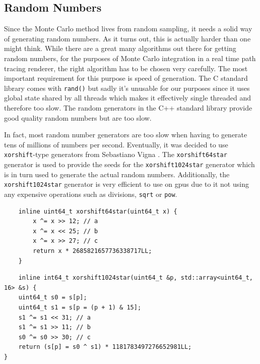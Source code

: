 \documentclass[
  twoside,
  11pt, a4paper,
  footinclude=true,
  headinclude=true,
  cleardoublepage=empty
]{scrreprt}
\begin{document}
\subsection{Random Numbers}
Since the Monte Carlo method lives from random sampling, it needs a solid way of generating random
numbers. As it turns out, this is actually harder than one might think. While there are a great
many algorithms out there for getting random numbers, for the purposes of Monte Carlo integration
in a real time path tracing renderer, the right algorithm has to be chosen very carefully. The most
important requirement for this purpose is speed of generation. The C standard library comes with
\texttt{rand()} but sadly it's unusable for our purposes since it uses global state
shared by all threads which makes it effectively single threaded and therefore too slow.
The random generators in the C++ standard library provide good quality random numbers but are too
slow.

In fact, most random number generators are too slow when having to generate tens of millions of numbers per
second. Eventually, it was decided to use \texttt{xorshift}-type generators from Sebastiano Vigna
\cite{site:xorshift}. The \texttt{xorshift64star} generator is used to provide the seeds for the
\texttt{xorshift1024star} generator which is in turn used to generate the actual random numbers.
Additionally, the \texttt{xorshift1024star} generator is very efficient to use on \acp{gpu} due to
it not using any expensive operations such as divisions, \texttt{sqrt} or \texttt{pow}.

\begin{verbatim}
    inline uint64_t xorshift64star(uint64_t x) {
        x ^= x >> 12; // a
        x ^= x << 25; // b
        x ^= x >> 27; // c
        return x * 2685821657736338717LL;
    }
\end{verbatim}

\begin{verbatim}
    inline int64_t xorshift1024star(uint64_t &p, std::array<uint64_t, 16> &s) {
    uint64_t s0 = s[p];
    uint64_t s1 = s[p = (p + 1) & 15];
    s1 ^= s1 << 31; // a
    s1 ^= s1 >> 11; // b
    s0 ^= s0 >> 30; // c
    return (s[p] = s0 ^ s1) * 1181783497276652981LL;
}
\end{verbatim}
\end{document}
